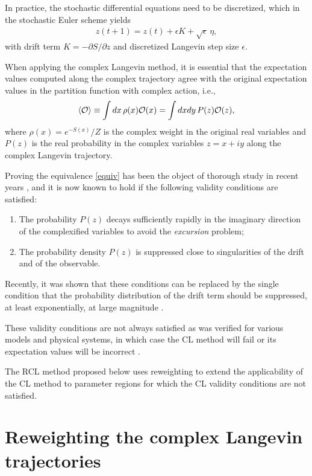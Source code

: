 \documentclass[prd,showpacs,reprint,nofootinbib,showkeys]{revtex4-1}
\newcommand{\Obs}{{\cal O}}
\begin{document}
In practice, the stochastic differential equations need to be discretized, which in the stochastic Euler scheme yields
\begin{align}
z(t+1) = z(t) + \epsilon K + \sqrt{\epsilon}\,\eta ,
\label{Euler}
\end{align}
with drift term $K = -\partial S/\partial z$ and discretized Langevin step size $\epsilon$. 

When applying the complex Langevin method, it is essential that the expectation values computed along the complex trajectory agree with the original expectation values in the partition function with complex action, i.e.,
\begin{align}
\braket{\Obs} \equiv  \int dx \, \rho(x) {\cal O}(x) = \int dx dy \, P(z) {\cal O}(z),
\label{equiv}
\end{align}
where $\rho(x) = e^{-S(x)}/Z$ is the complex weight in the original real variables and $P(z)$ is the real probability in the complex variables $z=x+iy$ along the complex Langevin trajectory.

Proving the equivalence \eqref{equiv} has been the object of thorough study in recent years \cite{Aarts:2011ax,Nagata:2016vkn}, and it is now known to hold if the following validity conditions are satisfied:
\begin{enumerate}[label=(\roman*)]
\item The probability $P(z)$ decays sufficiently rapidly in the imaginary direction of the complexified variables to avoid the \textit{excursion} problem;
\item The probability density $P(z)$ is suppressed close to singularities of the drift and of the observable.
\end{enumerate}
Recently, it was shown that these conditions can be replaced by the single condition that the probability distribution of the drift term should be suppressed, at least exponentially, at large magnitude \cite{Nagata:2016vkn}.

These validity conditions are not always satisfied as was verified for various models and physical systems, in which case the CL method will fail or its expectation values will be incorrect \cite{Mollgaard:2013qra,Makino:2015ooa,Bloch:2015coa,Nishimura:2015pba,Nagata:2016vkn,Salcedo:2016kyy}.

The RCL method proposed below uses reweighting to extend the applicability of the CL method to parameter regions for which the CL validity conditions are not satisfied. 

\section{Reweighting the complex Langevin trajectories}
\label{sec:rcl}
\end{document}
